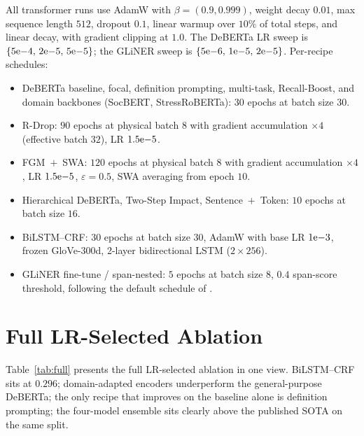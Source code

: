 \documentclass[11pt]{article}
\begin{document}
All transformer runs use AdamW with $\beta = (0.9, 0.999)$,
weight decay $0.01$, max sequence length $512$, dropout $0.1$,
linear warmup over $10\%$ of total steps, and linear decay, with
gradient clipping at $1.0$. The DeBERTa LR sweep is
$\{5{\rm e}{-4},\,2{\rm e}{-5},\,5{\rm e}{-5}\}$; the GLiNER sweep is
$\{5{\rm e}{-6},\,1{\rm e}{-5},\,2{\rm e}{-5}\}$. Per-recipe
schedules:
\begin{itemize}\itemsep0em
\item DeBERTa baseline, focal, definition prompting, multi-task,
Recall-Boost, and domain backbones (SocBERT, StressRoBERTa):
$30$ epochs at batch size $30$.
\item R-Drop: $90$ epochs at physical batch $8$ with gradient
accumulation $\times 4$ (effective batch $32$), LR $1.5{\rm e}{-5}$.
\item FGM~$+$~SWA: $120$ epochs at physical batch $8$ with gradient
accumulation $\times 4$, LR $1.5{\rm e}{-5}$, $\varepsilon = 0.5$, SWA
averaging from epoch $10$.
\item Hierarchical DeBERTa, Two-Step Impact, Sentence~$+$~Token:
$10$ epochs at batch size $16$.
\item BiLSTM--CRF: $30$ epochs at batch size $30$, AdamW with base LR
$1{\rm e}{-3}$, frozen GloVe-300d, 2-layer bidirectional LSTM
($2\times256$).
\item GLiNER fine-tune / span-nested: $5$ epochs at batch size $8$,
$0.4$ span-score threshold, following the default schedule of
\citet{zaratiana2024gliner}.
\end{itemize}

\section{Full LR-Selected Ablation}
\label{sec:full-ablation}

Table~\ref{tab:full} presents the full LR-selected ablation in one
view. BiLSTM--CRF sits at $0.296$; domain-adapted encoders underperform
the general-purpose DeBERTa; the only recipe that improves on the
baseline alone is definition prompting; the four-model ensemble sits
clearly above the published SOTA on the same split.
\end{document}

